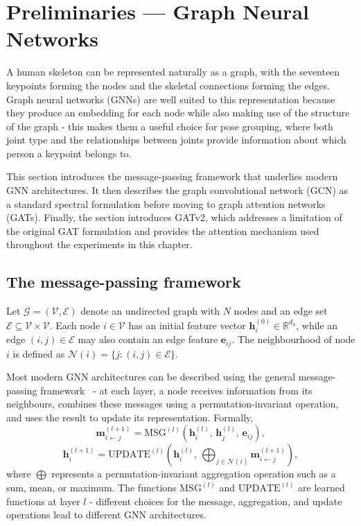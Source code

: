 \section{Preliminaries --- Graph Neural Networks}
\label{sec_meth_gnn}

A human skeleton can be represented naturally as a graph,
with the seventeen keypoints forming the nodes and the skeletal connections forming the edges.
Graph neural networks (GNNs) are well suited to this representation
because they produce an embedding for each node while also making use of the structure of the graph -
this makes them a useful choice for pose grouping,
where both joint type and the relationships between joints
provide information about which person a keypoint belongs to.

This section introduces the message-passing framework that underlies modern GNN architectures.
It then describes the graph convolutional network (GCN) as a standard spectral formulation
before moving to graph attention networks (GATs).
Finally, the section introduces GATv2,
which addresses a limitation of the original GAT formulation
and provides the attention mechanism used throughout the experiments in this chapter.

\subsection{The message-passing framework}
\label{sec_meth_mp}

Let $\mathcal{G} = (\mathcal{V}, \mathcal{E})$ denote an undirected graph
with $N$ nodes and an edge set $\mathcal{E} \subseteq \mathcal{V} \times \mathcal{V}$.
Each node $i \in \mathcal{V}$ has an initial feature vector $\mathbf{h}_i^{(0)} \in \mathbb{R}^{d_0}$,
while an edge $(i,j) \in \mathcal{E}$ may also contain an edge feature $\mathbf{e}_{ij}$.
The neighbourhood of node $i$ is defined as $\mathcal{N}(i) = \{j : (i,j) \in \mathcal{E}\}$.

Most modern GNN architectures can be described using the general message-passing framework~\cite{gilmer2017mpnn} -
at each layer,
a node receives information from its neighbours,
combines these messages using a permutation-invariant operation,
and uses the result to update its representation.
Formally,
\begin{equation}
    \mathbf{m}_{i \leftarrow j}^{(l+1)} =
    \mathrm{MSG}^{(l)}\!\left(
        \mathbf{h}_i^{(l)},\,
        \mathbf{h}_j^{(l)},\,
        \mathbf{e}_{ij}
    \right),
    \label{eq:mpnn_message}
\end{equation}
\begin{equation}
    \mathbf{h}_i^{(l+1)} =
    \mathrm{UPDATE}^{(l)}\!\left(
        \mathbf{h}_i^{(l)},\,
        \bigoplus_{j \in \mathcal{N}(i)}
        \mathbf{m}_{i \leftarrow j}^{(l+1)}
    \right),
    \label{eq:mpnn_update}
\end{equation}
where $\bigoplus$ represents a permutation-invariant aggregation operation such as a sum, mean, or maximum.
The functions $\mathrm{MSG}^{(l)}$ and $\mathrm{UPDATE}^{(l)}$ are learned functions at layer $l$ -
different choices for the message, aggregation, and update operations lead to different GNN architectures.


